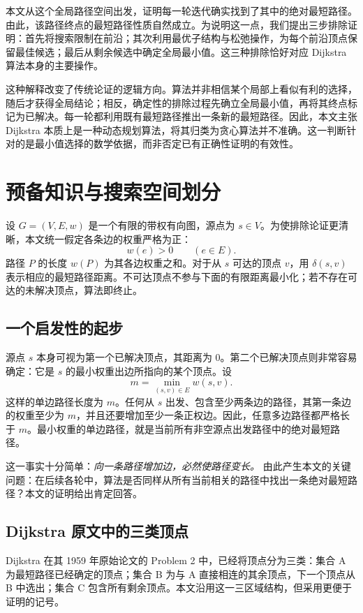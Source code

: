 \documentclass[UTF8,11pt,a4paper]{ctexart}
\begin{document}
本文从这个全局路径空间出发，证明每一轮迭代确实找到了其中的绝对最短路径。由此，该路径终点的最短路径性质自然成立。为说明这一点，我们提出三步排除证明：首先将搜索限制在前沿；其次利用最优子结构与松弛操作，为每个前沿顶点保留最佳候选；最后从剩余候选中确定全局最小值。这三种排除恰好对应 Dijkstra 算法本身的主要操作。

这种解释改变了传统论证的逻辑方向。算法并非相信某个局部上看似有利的选择，随后才获得全局结论；相反，确定性的排除过程先确立全局最小值，再将其终点标记为已解决。每一轮都利用既有最短路径推出一条新的最短路径。因此，本文主张 Dijkstra 本质上是一种动态规划算法，将其归类为贪心算法并不准确。这一判断针对的是最小值选择的数学依据，而非否定已有正确性证明的有效性。

\section{预备知识与搜索空间划分}\label{sec:prelim}
设 $G=(V,E,w)$ 是一个有限的带权有向图，源点为 $s\in V$。为使排除论证更清晰，本文统一假定各条边的权重严格为正：
\[
  w(e)>0\qquad(e\in E).
\]
路径 $P$ 的长度 $w(P)$ 为其各边权重之和。对于从 $s$ 可达的顶点 $v$，用 $\delta(s,v)$ 表示相应的最短路径距离。不可达顶点不参与下面的有限距离最小化；若不存在可达的未解决顶点，算法即终止。

\subsection{一个启发性的起步}
源点 $s$ 本身可视为第一个已解决顶点，其距离为 $0$。第二个已解决顶点则非常容易确定：它是 $s$ 的最小权重出边所指向的某个顶点。设
\[
  m=\min_{(s,v)\in E}w(s,v).
\]
这样的单边路径长度为 $m$。任何从 $s$ 出发、包含至少两条边的路径，其第一条边的权重至少为 $m$，并且还要增加至少一条正权边。因此，任意多边路径都严格长于 $m$。最小权重的单边路径，就是当前所有非空源点出发路径中的绝对最短路径。

这一事实十分简单：\emph{向一条路径增加边，必然使路径变长。} 由此产生本文的关键问题：在后续各轮中，算法是否同样从所有当前相关的路径中找出一条绝对最短路径？本文的证明给出肯定回答。

\subsection{Dijkstra 原文中的三类顶点}
Dijkstra 在其 1959 年原始论文的 Problem 2 中，已经将顶点分为三类\cite{Dijkstra1959}：集合 A 为最短路径已经确定的顶点；集合 B 为与 A 直接相连的其余顶点，下一个顶点从 B 中选出；集合 C 包含所有剩余顶点。本文沿用这一三区域结构，但采用更便于证明的记号。
\end{document}
